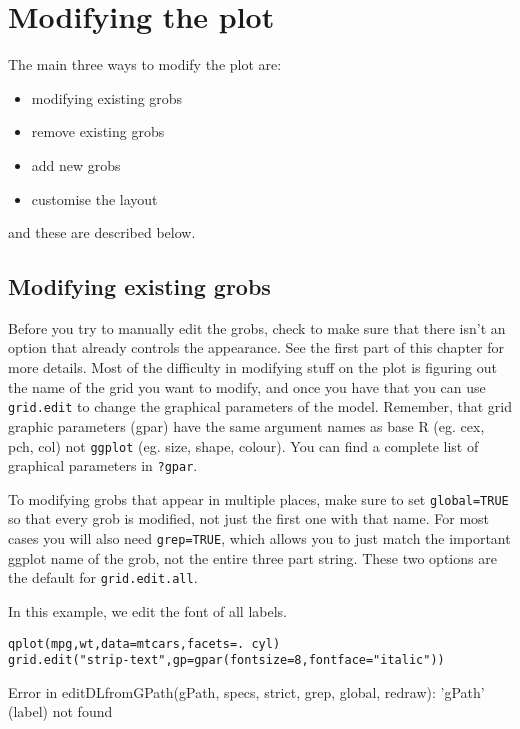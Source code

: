 \newpage
\section{Modifying the plot}

The main three ways to modify the plot are:

\begin{itemize}
  \item modifying existing grobs
  \item remove existing grobs
  \item add new grobs
  \item customise the layout
\end{itemize}

\noindent and these are described below.

\subsection{Modifying existing grobs}\label{sec:modifying_stuff}

Before you try to manually edit the grobs, check to make sure that there isn't an option that already controls the appearance.  See the first part of this chapter for more details.  Most of the difficulty in modifying stuff on the plot is figuring out the name of the grid you want to modify, and once you have that you can use  {\tt grid.edit} to change the graphical parameters of the model.  Remember, that grid graphic parameters (gpar) have the same argument names as base R (eg. cex, pch, col) not {\tt ggplot} (eg. size, shape, colour).  You can find a complete list of graphical parameters in {\tt ?gpar}.

To modifying grobs that appear in multiple places, make sure to set {\tt global=TRUE} so that every grob is modified, not just the first one with that name.  For most cases you will also need {\tt grep=TRUE}, which allows you to just match the important ggplot name of the grob, not the entire three part string.  These two options are the default for {\tt grid.edit.all}.

In this example, we edit the font of all labels.

\begin{alltt}
qplot(mpg, wt, data=mtcars, facets = . ~ cyl)
grid.edit("strip-text", gp=gpar(fontsize=8, fontface="italic"))
\end{alltt}

Error in editDLfromGPath(gPath, specs, strict, grep, global, redraw): 'gPath' (label) not found \\ 

